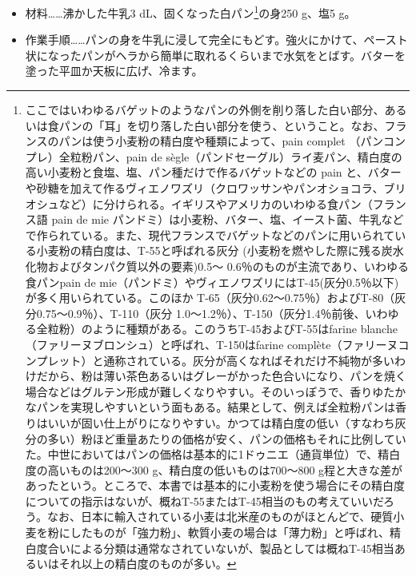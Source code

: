 \begin{recette}
\begin{itemize}
\item
  材料\ldots{}\ldots{}沸かした牛乳3 dL、固くなった白パン\footnote{ここではいわゆるバゲットのようなパンの外側を削り落した白い部分、あるいは食パンの「耳」を切り落した白い部分を使う、ということ。なお、フランスのパンは使う小麦粉の精白度や種類によって、pain
    complet （パンコンプレ）全粒粉パン、pain de
    sègle（パンドセーグル）ライ麦パン、精白度の高い小麦粉と食塩、塩、パン種だけで作るバゲットなどの
    pain
    と、バターや砂糖を加えて作るヴィエノワズリ（クロワッサンやパンオショコラ、ブリオシュなど）に分けられる。イギリスやアメリカのいわゆる食パン（フランス語
    pain de mie
    パンドミ）は小麦粉、バター、塩、イースト菌、牛乳などで作られている。また、現代フランスでバゲットなどのパンに用いられている小麦粉の精白度は、T-55と呼ばれる灰分
    (小麦粉を燃やした際に残る炭水化物およびタンパク質以外の要素)0.5〜
    0.6％のものが主流であり、いわゆる食パンpain de
    mie（パンドミ）やヴィエノワズリにはT-45(灰分0.5％以下)が多く用いられている。このほか
    T-65（灰分0.62〜0.75％）およびT-80（灰分0.75〜0.9％）、T-110（灰分
    1.0〜1.2％）、T-150（灰分1.4％前後、いわゆる全粒粉）のように種類がある。このうちT-45およびT-55はfarine
    blanche（ファリーヌブロンシュ）と呼ばれ、T-150はfarine
    complète（ファリーヌコンプレット）と通称されている。灰分が高くなればそれだけ不純物が多いわけだから、粉は薄い茶色あるいはグレーがかった色合いになり、パンを焼く場合などはグルテン形成が難しくなりやすい。そのいっぽうで、香りゆたかなパンを実現しやすいという面もある。結果として、例えば全粒粉パンは香りはいいが固い仕上がりになりやすい。かつては精白度の低い（すなわち灰分の多い）粉ほど重量あたりの価格が安く、パンの価格もそれに比例していた。中世においてはパンの価格は基本的に1ドゥニエ（通貨単位）で、精白度の高いものは200〜300
    g、精白度の低いものは700〜800
    g程と大きな差があったという。ところで、本書では基本的に小麦粉を使う場合にその精白度についての指示はないが、概ねT-55またはT-45相当のもの考えていいだろう。なお、日本に輸入されている小麦は北米産のものがほとんどで、硬質小麦を粉にしたものが「強力粉」、軟質小麦の場合は「薄力粉」と呼ばれ、精白度合いによる分類は通常なされていないが、製品としては概ねT-45相当あるいはそれ以上の精白度のものが多い。}の身250
  g、塩5 g。
\item
  作業手順\ldots{}\ldots{}パンの身を牛乳に浸して完全にもどす。強火にかけて、ペースト状になったパンがヘラから簡単に取れるくらいまで水気をとばす。バターを塗った平皿か天板に広げ、冷ます。
\end{itemize}

\hypertarget{panade-b}{%
}
\end{recette}
